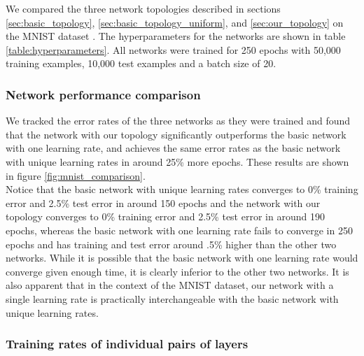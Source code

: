 \documentclass{article}
\newcommand{\npar}{\\\indent}
\begin{document}
We compared the three network topologies described in sections \ref{sec:basic_topology}, \ref{sec:basic_topology_uniform}, and \ref{sec:our_topology} on the MNIST dataset \cite{mnist1998}. The hyperparameters for the networks are shown in table \ref{table:hyperparameters}. All networks were trained for 250 epochs with 50,000 training examples, 10,000 test examples and a batch size of 20.

\subsubsection{Network performance comparison}
\label{sec:network_performance}

We tracked the error rates of the three networks as they were trained and found that the network with our topology significantly outperforms the basic network with one learning rate, and achieves the same error rates as the basic network with unique learning rates in around 25\% more epochs. These results are shown in figure \ref{fig:mnist_comparison}.
\npar
 Notice that the basic network with unique learning rates converges to 0\% training error and 2.5\% test error in around 150 epochs and the network with our topology converges to 0\% training error and 2.5\% test error in around 190 epochs, whereas the basic network with one learning rate fails to converge in 250 epochs and has training and test error around .5\% higher than the other two networks. While it is possible that the basic network with one learning rate would converge given enough time, it is clearly inferior to the other two networks. It is also apparent that in the context of the MNIST dataset, our network with a single learning rate is practically interchangeable with the basic network with unique learning rates.

\subsubsection{Training rates of individual pairs of layers}
\label{sec:mnist_perlayer}
\end{document}
